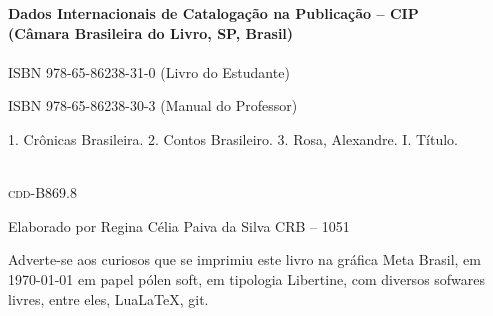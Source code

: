 \pagebreak

\ifodd\thepage\blankpage\fi

\parindent=0pt
\footnotesize\thispagestyle{empty}

\noindent\textbf{Dados Internacionais de Catalogação na Publicação -- CIP}\\
\noindent\textbf{(Câmara Brasileira do Livro, SP, Brasil)}\\

\dotfill\\

\hspace{20pt}ISBN 978-65-86238-31-0 (Livro do Estudante)

\hspace{20pt}ISBN 978-65-86238-30-3 (Manual do Professor)\\[6pt]

\hspace{20pt}\parbox{190pt}{1. Crônicas Brasileira. 2. Contos Brasileiro. 3. Rosa, Alexandre. I. Título.}\\[6pt]

\hspace{188pt}\textsc{cdd}-B869.8

\dotfill

\noindent{}Elaborado por Regina Célia Paiva da Silva CRB -- 1051\\
\mbox{}\vfill


\begin{center}
		\begin{minipage}{.7\textwidth}\tiny\noindent{}
		\centering\small
		Adverte-se aos curiosos que se imprimiu este 
		livro na gráfica Meta Brasil, 
		em \today{} em papel pólen soft, em tipologia Libertine, 
		com diversos sofwares livres, 
		entre eles, Lua\LaTeX, git.\\ 
		\medskip\\\
		\end{minipage}
\end{center}